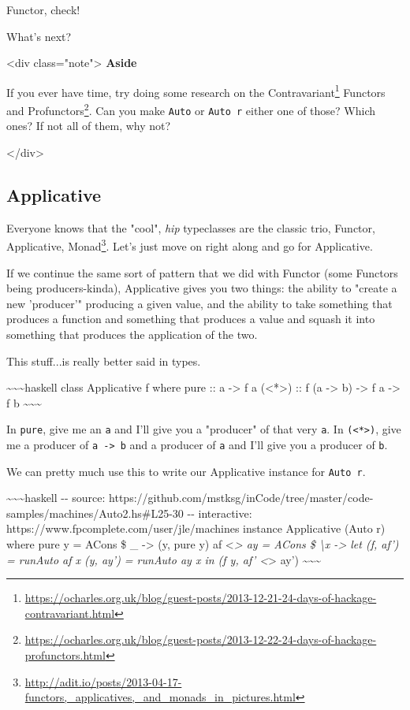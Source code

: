 \documentclass[]{article}
\renewcommand{\href}[2]{#2\footnote{\url{#1}}}
\begin{document}
Functor, check!

What's next?

\textless{}div class="note"\textgreater{} \textbf{Aside}

If you ever have time, try doing some research on the
\href{https://ocharles.org.uk/blog/guest-posts/2013-12-21-24-days-of-hackage-contravariant.html}{Contravariant}
Functors and
\href{https://ocharles.org.uk/blog/guest-posts/2013-12-22-24-days-of-hackage-profunctors.html}{Profunctors}.
Can you make \texttt{Auto} or \texttt{Auto\ r} either one of those? Which ones?
If not all of them, why not?

\textless{}/div\textgreater{}

\subsection{Applicative}

Everyone knows that the "cool", \emph{hip} typeclasses are the classic trio,
\href{http://adit.io/posts/2013-04-17-functors,_applicatives,_and_monads_in_pictures.html}{Functor,
Applicative, Monad}. Let's just move on right along and go for Applicative.

If we continue the same sort of pattern that we did with Functor (some Functors
being producers-kinda), Applicative gives you two things: the ability to "create
a new 'producer'" producing a given value, and the ability to take something
that produces a function and something that produces a value and squash it into
something that produces the application of the two.

This stuff...is really better said in types.

\textasciitilde{}\textasciitilde{}\textasciitilde{}haskell class Applicative f
where pure :: a -\textgreater{} f a (\textless{}*\textgreater{}) :: f (a
-\textgreater{} b) -\textgreater{} f a -\textgreater{} f b
\textasciitilde{}\textasciitilde{}\textasciitilde{}

In \texttt{pure}, give me an \texttt{a} and I'll give you a "producer" of that
very \texttt{a}. In \texttt{(\textless{}*\textgreater{})}, give me a producer of
\texttt{a\ -\textgreater{}\ b} and a producer of \texttt{a} and I'll give you a
producer of \texttt{b}.

We can pretty much use this to write our Applicative instance for
\texttt{Auto\ r}.

\textasciitilde{}\textasciitilde{}\textasciitilde{}haskell -\/- source:
https://github.com/mstksg/inCode/tree/master/code-samples/machines/Auto2.hs\#L25-30
-\/- interactive: https://www.fpcomplete.com/user/jle/machines instance
Applicative (Auto r) where pure y = ACons \$ \_ -\textgreater{} (y, pure y) af
\textless{}\emph{\textgreater{} ay = ACons \$ \textbackslash{}x -\textgreater{}
let (f, af') = runAuto af x (y, ay') = runAuto ay x in (f y, af'
\textless{}}\textgreater{} ay')
\textasciitilde{}\textasciitilde{}\textasciitilde{}
\end{document}
